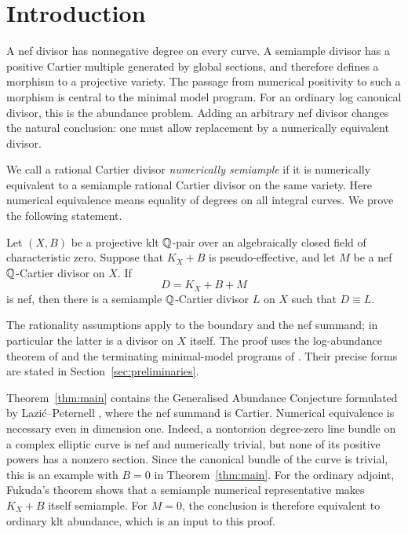 \section{Introduction}
\label{sec:introduction}

A nef divisor has nonnegative degree on every curve. A semiample
divisor has a positive Cartier multiple generated by global sections,
and therefore defines a morphism to a projective variety. The passage
from numerical positivity to such a morphism is central to the minimal
model program. For an ordinary log canonical divisor, this is the
abundance problem. Adding an arbitrary nef divisor changes the natural
conclusion: one must allow replacement by a numerically equivalent
divisor.

We call a rational Cartier divisor \emph{numerically semiample} if it is
numerically equivalent to a semiample rational Cartier divisor on the
same variety. Here numerical equivalence means equality of degrees on
all integral curves. We prove the following statement.

\begin{theorem}\label{thm:main}
Let $(X,B)$ be a projective klt $\mathbb Q$-pair over an algebraically closed
field of characteristic zero. Suppose that $K_X+B$ is pseudo-effective,
and let $M$ be a nef $\mathbb Q$-Cartier divisor on $X$. If
\[
                         D=K_X+B+M
\]
is nef, then there is a semiample $\mathbb Q$-Cartier divisor $L$ on $X$ such
that $D\equiv L$.
\end{theorem}

The rationality assumptions apply to the boundary and the nef summand;
in particular the latter is a divisor on $X$ itself. The proof uses the
log-abundance theorem of \cite[Theorem~1.1]{LA} and the terminating
minimal-model programs of \cite[Theorem~1.1 and Section~3.3]{MM}.
Their precise forms are stated in Section~\ref{sec:preliminaries}.

Theorem~\ref{thm:main} contains the Generalised Abundance Conjecture
formulated by Lazi\'c--Peternell \cite{LP}, where the nef summand is
Cartier. Numerical equivalence is necessary even in dimension one.
Indeed, a nontorsion degree-zero line bundle on a complex elliptic curve
is nef and numerically trivial, but none of its positive powers has a
nonzero section. Since the canonical bundle of the curve is trivial,
this is an example with $B=0$ in Theorem~\ref{thm:main}.
For the ordinary adjoint, Fukuda's theorem
\cite[Theorem~0.1]{Fukuda} shows that a semiample numerical
representative makes $K_X+B$ itself semiample. For $M=0$, the conclusion
is therefore equivalent to ordinary klt abundance, which is an input
to this proof.

